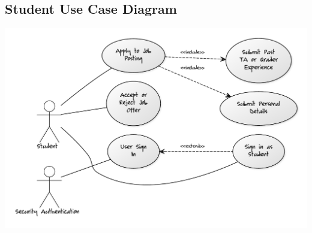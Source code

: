 \documentclass[12pt,openany]{report}
\begin{document}
\subsection{Student Use Case Diagram}
\includegraphics[scale=0.5]{model/Diagrams/UC/studentUC}
\end{document}

